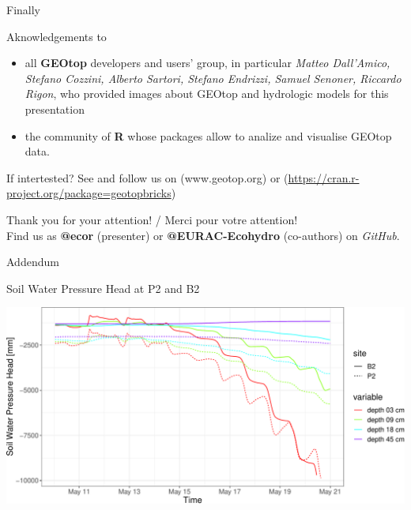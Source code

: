 \documentclass[ignorenonframetext,]{beamer}
\providecommand{\tightlist}{%
  \setlength{\itemsep}{0pt}\setlength{\parskip}{0pt}}
\begin{document}
\begin{frame}{Finally}

Aknowledgements to

\begin{itemize}
\tightlist
\item
  all \textbf{GEOtop} developers and users' group, in particular
  \emph{Matteo Dall'Amico, Stefano Cozzini, Alberto Sartori, Stefano
  Endrizzi, Samuel Senoner, Riccardo Rigon}, who provided images about
  GEOtop and hydrologic models for this presentation
\item
  the community of \textbf{R} whose packages allow to analize and
  visualise GEOtop data.
\end{itemize}

If intertested? See and follow us on (www.geotop.org) or
(\url{https://cran.r-project.org/package=geotopbricks})

Thank you for your attention! / Merci pour votre attention!\\
Find us as \textbf{@ecor} (presenter) or \textbf{@EURAC-Ecohydro}
(co-authors) on \emph{GitHub}.

\end{frame}

\begin{frame}{Addendum}

\end{frame}

\begin{frame}{Soil Water Pressure Head at P2 and B2}

\includegraphics{presentation_files/figure-beamer/unnamed-chunk-17-1.pdf}

\end{frame}
\end{document}
